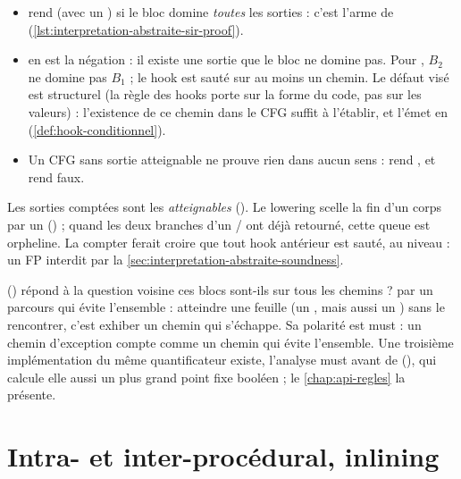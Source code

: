 \begin{itemize}
  \item {} rend  (avec un ) si le bloc
    domine \emph{toutes} les sorties : c'est l'arme de 
    (\cref{lst:interpretation-abstraite-sir-proof}).
  \item {} en est la négation : il existe une sortie que le
    bloc ne domine pas. Pour , $B_2$ ne domine pas $B_1$ ; le hook
    est sauté sur au moins un chemin. Le défaut visé est structurel (la règle
    des hooks porte sur la forme du code, pas sur les valeurs) : l'existence
    de ce chemin dans le CFG suffit à l'établir, et
     l'émet en \Error{} (\cref{def:hook-conditionnel}).
  \item Un CFG sans sortie atteignable ne prouve rien dans aucun sens :
     rend , et  rend faux.
\end{itemize}

\begin{piege}
  Les sorties comptées sont les  \emph{atteignables}
  (). Le lowering scelle la fin d'un
  corps par un  () ; quand les deux branches
  d'un / ont déjà retourné, cette queue est orpheline. La
  compter ferait croire que tout hook antérieur est sauté, au niveau
  \Error{} : un FP interdit par la \cref{sec:interpretation-abstraite-soundness}.
\end{piege}

 () répond à la
question voisine \og ces blocs sont-ils sur tous les chemins ?\fg{} par un
parcours qui évite l'ensemble : atteindre une feuille (un , mais
aussi un ) sans le rencontrer, c'est exhiber un chemin qui
s'échappe. Sa polarité est must : un chemin d'exception compte comme un
chemin qui évite l'ensemble. Une troisième implémentation du même
quantificateur existe, l'analyse must avant de 
(), qui calcule elle aussi un plus grand
point fixe booléen ; le \cref{chap:api-regles} la présente.

\section{Intra- et inter-procédural, inlining}
\label{sec:interpretation-abstraite-inlining}


